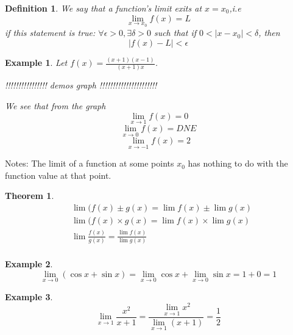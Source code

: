 \documentclass{article}
\newtheorem{definition}{Definition}
\newtheorem{ex}{Example}
\newtheorem{thm}{Theorem}
\begin{document}
\begin{definition}
	 We say that a function's limit exits at $x= x_0$,i.e 
	 \[ \lim_{x\to x_0} f(x) = L \]
	 if this statement is true: $\forall \epsilon>0, \exists \delta>0$ such that if $0<|x-x_0|<\delta$, then
	\[ |f(x)-L| < \epsilon \]
\end{definition}

\begin{ex}
	Let $f(x) = \frac{(x+1)(x-1)}{(x+1)x} $.
	\begin{center}
	!!!!!!!!!!!!!!!! demos graph !!!!!!!!!!!!!!!!!!!!!!
	\end{center}
We see that from the graph 
\[ \lim_{x\to1} f(x) = 0 \]
\[ \lim_{x\to0} f(x) = DNE\]
\[ \lim_{x\to-1} f(x) = 2 \]

\end{ex}

Notes: The limit of a function at some points $x_0$ has nothing to do with the function value at that point.

\begin{thm}
	\begin{align*}
	&\lim (f(x) \pm g(x) = \lim f(x) \pm \lim g(x)\\
	&\lim (f(x) \times g(x) = \lim f(x) \times \lim g(x)\\
	&\lim \frac{f(x)}{g(x)} =\frac{ \lim f(x)}{\lim g(x)}\\
	\end{align*}
\end{thm}

\begin{ex}
	\[\lim_{x\to 0}(\cos x+ \sin x) = \lim_{x\to 0}\cos x + \lim_{x\to 0}\sin x = 1+ 0 =1 \]
\end{ex}

\begin{ex}
	\[ \lim_{x\to 1} \frac{x^2}{x+1} = \frac{\lim_{x\to1} x^2}{\lim_{x\to 1}(x+1)} = \frac{1}{2} \]
\end{ex}
 
\end{document}

